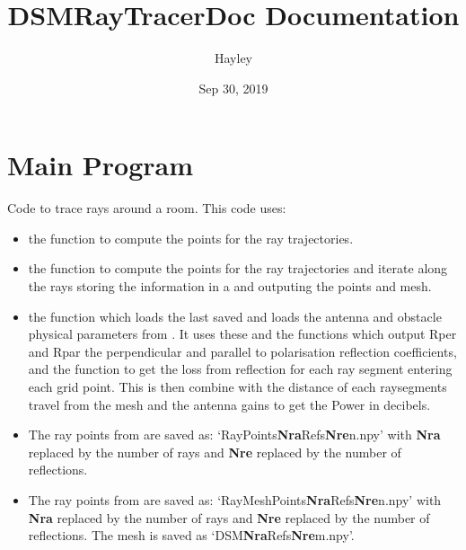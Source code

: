 \documentclass[letterpaper,10pt,english]{sphinxmanual}
\title{DSMRayTracerDoc Documentation}
\date{Sep 30, 2019}
\author{Hayley}
\begin{document}
\maketitle
\tableofcontents
{}\label{index::doc}



\chapter{Main Program}
\label{index:main-program}\label{index:welcome-to-dsmraytracerdoc-s-documentation}\label{index:module-RayTracerMainProgram}
Code to trace rays around a room. This code uses:
\begin{itemize}
\item {} 
the function {\hyperref[index:RayTracerMainProgram.RayTracer]{}} to compute the points for   the ray trajectories.

\item {} 
the function {\hyperref[index:RayTracerMainProgram.MeshProgram]{}} to compute the points for   the ray trajectories and iterate along the rays storing the   information in a {\hyperref[index:DictionarySparseMatrix.DS]{}} and outputing   the points and mesh.

\item {} 
the function {\hyperref[index:RayTracerMainProgram.power_grid]{}} which loads the last saved   and loads the antenna and obstacle physical parameters from   {\hyperref[index:ParameterInput.ObstacleCoefficients]{}}. It uses these and   the functions {\hyperref[index:RayTracerMainProgram.RefCoefComputation]{}} which output Rper   and Rpar the perpendicular and parallel to polarisation reflection   coefficients, and the function {\hyperref[index:RayTracerMainProgram.RefCombine]{}} to   get the loss from reflection for each ray segment entering each grid   point. This is then combine with the distance of each raysegments   travel from the mesh and the antenna gains to get the Power in   decibels.

\item {} 
The ray points from {\hyperref[index:RayTracerMainProgram.RayTracer]{}} are saved as:
`RayPoints\textbf{Nra}Refs\textbf{Nre}n.npy' with \textbf{Nra} replaced by the     number of rays and \textbf{Nre} replaced by the number of reflections.

\item {} 
The ray points from {\hyperref[index:RayTracerMainProgram.MeshProgram]{}} are saved as:
`RayMeshPoints\textbf{Nra}Refs\textbf{Nre}n.npy' with \textbf{Nra} replaced     by the     number of rays and \textbf{Nre} replaced by the number of reflections.     The mesh is saved as `DSM\textbf{Nra}Refs\textbf{Nre}m.npy'.

\end{itemize}
\end{document}
